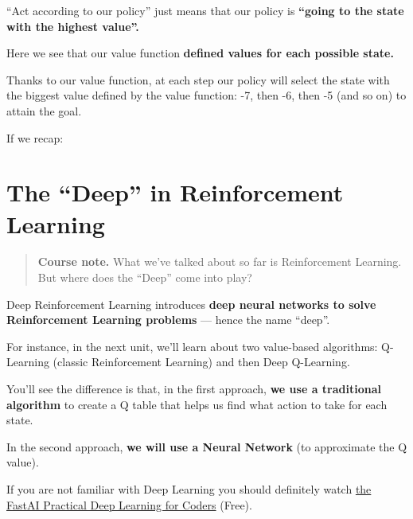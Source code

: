 \documentclass[11pt,a4paper]{article}
\begin{document}
``Act according to our policy'' just means that our policy is \textbf{``going to the state with the highest value''.}


Here we see that our value function \textbf{defined values for each possible state.}


Thanks to our value function, at each step our policy will select the state with the biggest value defined by the value function: -7, then -6, then -5 (and so on) to attain the goal.

If we recap:



\section{The ``Deep'' in Reinforcement Learning}\label{the-deep-in-reinforcement-learning}

\begin{quote}
\textbf{Course note.} What we've talked about so far is Reinforcement Learning. But where does the ``Deep'' come into play?
\end{quote}

Deep Reinforcement Learning introduces \textbf{deep neural networks to solve Reinforcement Learning problems} --- hence the name ``deep''.

For instance, in the next unit, we'll learn about two value-based algorithms: Q-Learning (classic Reinforcement Learning) and then Deep Q-Learning.

You'll see the difference is that, in the first approach, \textbf{we use a traditional algorithm} to create a Q table that helps us find what action to take for each state.

In the second approach, \textbf{we will use a Neural Network} (to approximate the Q value).


If you are not familiar with Deep Learning you should definitely watch \href{https://course.fast.ai}{the FastAI Practical Deep Learning for Coders} (Free).
\end{document}
